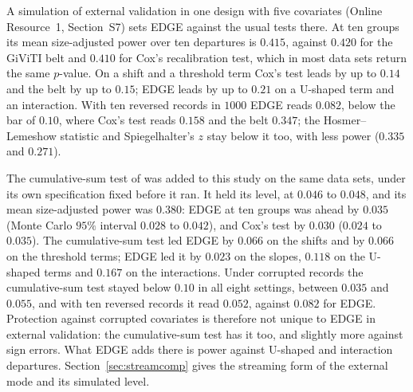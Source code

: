 A simulation of external validation in one design with five covariates (Online Resource~1, Section~S7)
sets EDGE against the usual tests there. At ten groups its mean size-adjusted power over ten
departures is $0.415$, against $0.420$ for the GiViTI belt and $0.410$ for Cox's recalibration test,
which in most data sets return the same $p$-value. On a shift and a threshold term Cox's test leads by
up to $0.14$ and the belt by up to $0.15$; EDGE leads by up to $0.21$ on a U-shaped term and an
interaction. With ten reversed
records in $1000$ EDGE reads $0.082$, below the bar of $0.10$, where Cox's test reads $0.158$ and the belt
$0.347$; the Hosmer--Lemeshow statistic and Spiegelhalter's $z$ stay below it too, with less power
($0.335$ and $0.271$).

The cumulative-sum test of \citet{sadatsafavi2024nonparametric} was added to this study on the same
data sets, under its own specification fixed before it ran. It held its level, at $0.046$ to $0.048$,
and its mean size-adjusted power was $0.380$: EDGE at ten groups was ahead by $0.035$ (Monte Carlo
$95\%$ interval $0.028$ to $0.042$), and Cox's test by $0.030$ ($0.024$ to $0.035$). The cumulative-sum
test led EDGE by $0.066$ on the shifts and by $0.066$ on the threshold terms; EDGE led it by $0.023$ on
the slopes, $0.118$ on the U-shaped terms and $0.167$ on the interactions. Under corrupted records the
cumulative-sum test stayed below $0.10$ in all eight settings, between $0.035$ and $0.055$, and with ten
reversed records it read $0.052$, against $0.082$ for EDGE. Protection against corrupted covariates is
therefore not unique to EDGE in external validation: the cumulative-sum test has it too, and slightly
more against sign errors. What EDGE adds there is power against U-shaped and interaction departures.
Section~\ref{sec:streamcomp} gives the streaming form of the external mode and its simulated level.
